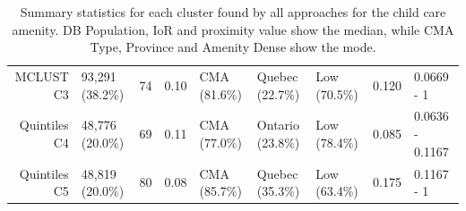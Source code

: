 \documentclass[11pt, a4paper]{article}
\begin{document}
\begin{table}[H]
{\begin{tabular}{|r|llllllll|}
  MCLUST C3 & 93,291 (38.2\%) & 74 & 0.10 & CMA (81.6\%) & Quebec (22.7\%) & Low (70.5\%) & 0.120 & 0.0669 - 1 \\ 
  Quintiles C4 & 48,776 (20.0\%) & 69 & 0.11 & CMA (77.0\%) & Ontario (23.8\%) & Low (78.4\%) & 0.085 & 0.0636 - 0.1167 \\ 
  Quintiles C5 & 48,819 (20.0\%) & 80 & 0.08 & CMA (85.7\%) & Quebec (35.3\%) & Low (63.4\%) & 0.175 & 0.1167 - 1 \\ 
   \hline
\end{tabular}
}
\caption[Child care cluster profiles]{Summary statistics for each cluster found by all approaches for the child care amenity. DB Population, IoR and proximity value show the median, while CMA Type, Province and Amenity Dense show the mode.}\label{childcareprofiles}
\end{table}
\end{document}
